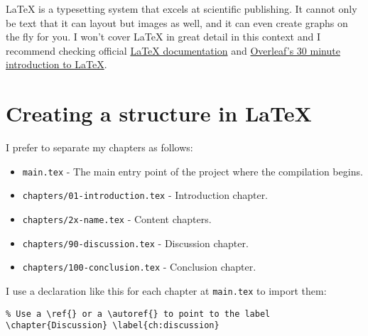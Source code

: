 LaTeX is a typesetting system that excels at scientific publishing.
It cannot only be text that it can layout but images as well, and it can even create graphs on the fly for you.
I won't cover LaTeX in great detail in this context and I recommend checking official \href{https://www.latex-project.org/}{LaTeX documentation} and \href{https://www.overleaf.com/learn/latex/Learn_LaTeX_in_30_minutes}{Overleaf's 30 minute introduction to LaTeX}. %

\section{Creating a structure in LaTeX}
\label{sec:creating-a-structure}


I prefer to separate my chapters as follows:

\begin{itemize}
    \item \texttt{main.tex} - The main entry point of the project where the compilation begins. %
    \item \texttt{chapters/01-introduction.tex} - Introduction chapter.
    \item \texttt{chapters/2x-name.tex} - Content chapters.
    \item \texttt{chapters/90-discussion.tex} - Discussion chapter.
    \item \texttt{chapters/100-conclusion.tex} - Conclusion chapter.
\end{itemize}

I use a declaration like this for each chapter at \texttt{main.tex} to import them:

\begin{verbatim}
% Use a \ref{} or a \autoref{} to point to the label
\chapter{Discussion} \label{ch:discussion}

\end{verbatim}

